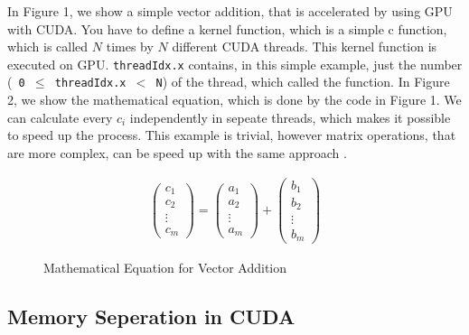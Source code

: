 \documentclass[conference]{IEEEtran}
\begin{document}
		In Figure 1, we show a simple vector addition, that is accelerated by using GPU with CUDA. You have to define a kernel function, which is a simple c function, which is called $N$ times by $N$ different CUDA threads. This kernel function is executed on GPU. \texttt{threadIdx.x} contains, in this simple example, just the number (\texttt{ 0 $\leq$ threadIdx.x $<$ N}) of the thread, which called the function. In Figure 2, we show the mathematical equation, which is done by the code in Figure 1. We can calculate every $c_i$ independently in sepeate threads, which makes it possible to speed up the process. This example is trivial, however matrix operations, that are more complex, can be speed up with the same approach \cite{cudap}.
		\begin{figure}[htbp] 
			\begin{align*}
				\begin{pmatrix}
				c_{1} \\
				c_{2} \\
				\vdots \\
				c_{m}
				\end{pmatrix} 
				= 
				\begin{pmatrix}
				a_{1} \\
				a_{2} \\
				\vdots \\
				a_{m}
				\end{pmatrix}
				+ 
				\begin{pmatrix}
				b_{1} \\
				b_{2} \\
				\vdots \\
				b_{m}
				\end{pmatrix}			
			\end{align*}
			\caption{Mathematical Equation for Vector Addition}
		\end{figure}
		
	
	\subsection{Memory Seperation in CUDA}
	
	
\end{document}
